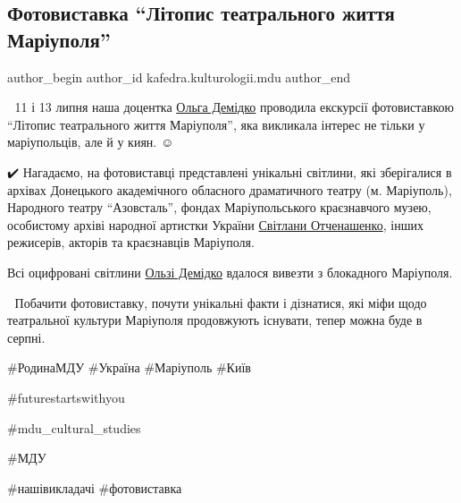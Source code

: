  
 
 
 
 

\subsection{Фотовиставка \enquote{Літопис театрального життя Маріуполя}}
\label{sec:13_07_2023.fb.kafedra.kulturologii.mdu.1.fotovystavka_litopys_teatr_zhyttja_mrpl}

\ifcmt
 author_begin
   author_id kafedra.kulturologii.mdu
 author_end
\fi


📎 11 і 13 липня наша доцентка \href{\urlDemidkoIA}{Ольга Демідко} проводила екскурсії фотовиставкою
\enquote{Літопис театрального життя Маріуполя}, яка викликала інтерес  не тільки у
маріупольців, але й у киян. ☺️

✔️ Нагадаємо, на фотовиставці  представлені унікальні світлини, які зберігалися
в архівах Донецького академічного обласного драматичного театру (м. Маріуполь),
Народного театру \enquote{Азовсталь}, фондах Маріупольського краєзнавчого музею,
особистому архіві народної артистки України \href{\urlSvitlanaIvanivnaOtchenashenkoIA}{Світлани Отченашенко}, інших
режисерів, акторів та краєзнавців Маріуполя.

Всі оцифровані світлини \href{\urlDemidkoIA}{Ользі Демідко} вдалося вивезти з блокадного Маріуполя.👏

📍 Побачити фотовиставку, почути  унікальні факти і дізнатися, які міфи щодо
театральної культури Маріуполя продовжують існувати, тепер  можна буде в
серпні.

\#РодинаМДУ  \#Україна \#Маріуполь \#Київ  

\#futurestartswithyou  

\#mdu\_cultural\_studies 

\#МДУ 

\#нашівикладачі \#фотовиставка
